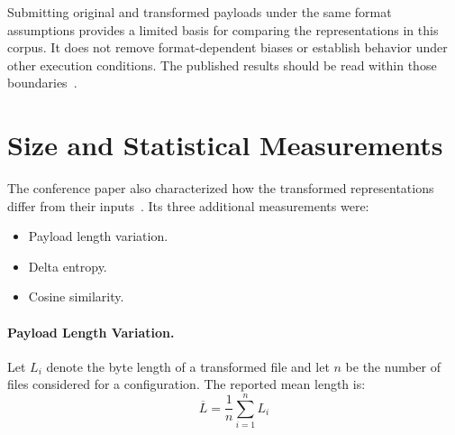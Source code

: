 \documentclass[runningheads]{llncs}
\begin{document}
Submitting original and transformed payloads under the same format assumptions provides a limited basis for comparing the representations in this corpus. It does not remove format-dependent biases or establish behavior under other execution conditions. The published results should be read within those boundaries~\cite{zone_secrypt_2026}.

\section{Size and Statistical Measurements}\label{sect:var_metrics}
The conference paper also characterized how the transformed representations differ from their inputs~\cite{zone_secrypt_2026}. Its three additional measurements were:

\begin{itemize}
    \item Payload length variation.
    \item Delta entropy.
    \item Cosine similarity.
\end{itemize}

\paragraph{Payload Length Variation.}
Let $L_i$ denote the byte length of a transformed file and let $n$ be the number of files considered for a configuration. The reported mean length is:
\[
\overline{L} = \frac{1}{n} \sum_{i=1}^{n} L_i
\]
\end{document}
